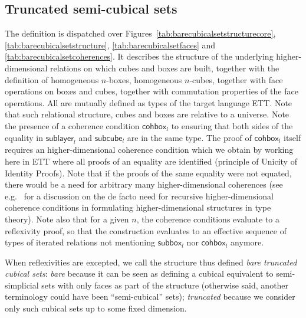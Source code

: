\documentclass[10pt]{amsart}
\newcommand{\sort}[1]{\ensuremath{\mathsf{U}_{#1}}}
\newcommand{\unittype}{\ensuremath{\mathsf{unit}}}
\newcommand{\defeq}{\ensuremath{\triangleq}}
\newcommand{\downbox}[2]{\ensuremath{\mathsf{subbox}_{#1}^{#2}}}
\newcommand{\downlayer}[2]{\ensuremath{\mathsf{sublayer}_{#1}^{#2}}}
\newcommand{\downcube}[2]{\ensuremath{\mathsf{subcube}_{#1}^{#2}}}
\newcommand{\myfullbox}[2]{\ensuremath{\mathsf{fullbox}_{#1}^{#2}}}
\newcommand{\cohbox}[2]{\ensuremath{\mathsf{cohbox}_{#1}^{#2}}}
\newcommand{\partialcubset}[2]{\ensuremath{\mathsf{cubset}_{#1}^{<#2}}}
\newcommand{\mycubsetcomp}[2]{\ensuremath{\mathsf{cubset}_{#1}^{=#2}}}
\newcommand{\imp}{\ensuremath{\rightarrow}}
\newcommand{\eqnline}[4]{$#1$ & $#2$ & $#3$ & $#4$ \\}
\newcommand{\mc}[1]{\multicolumn{4}{c}{\textit{#1}} \\\\}
\begin{document}
\subsection{Truncated semi-cubical sets}

The definition is dispatched over Figures~\ref{tab:barecubicalsetstructurecore}, \ref{tab:barecubicalsetstructure}, \ref{tab:barecubicalsetfaces} and \ref{tab:barecubicalsetcoherences}. It describes the structure of the underlying higher-dimensional relations on which cubes and boxes are built, together with the definition of homogeneous $n$-boxes, homogeneous $n$-cubes, together with face operations on boxes and cubes, together with commutation properties of the face operations. All are mutually defined as types of the target language ETT. Note that such relational structure, cubes and boxes are relative to a universe. Note the presence of a coherence condition $\cohbox{l}{}$ to ensuring that both sides of the equality in $\downlayer{l}{}$ and $\downcube{l}{}$ are in the same type. The proof of $\cohbox{l}{}$ itself requires an higher-dimensional coherence condition which we obtain by working here in ETT where all proofs of an equality are identified (principle of Unicity of Identity Proofs). Note that if the proofs of the same equality were not equated, there would be a need for arbitrary many higher-dimensional coherences (see e.g.~\cite{Herbelin15} for a discussion on the de facto need for recursive higher-dimensional coherence conditions in formulating higher-dimensional structures in type theory). Note also that for a given $n$, the coherence conditions evaluate to a reflexivity proof, so that the construction evaluates to an effective sequence of types of iterated relations not mentioning $\downbox{l}{}$ nor $\cohbox{l}{}$ anymore.

When reflexivities are excepted, we call the structure thus defined \emph{bare truncated cubical sets}: \emph{bare} because it can be seen as defining a cubical equivalent to semi-simplicial sets with only faces as part of the structure (otherwise said, another terminology could have been ``semi-cubical'' sets); \emph{truncated} because we consider only such cubical sets up to some fixed dimension.

\end{document}
